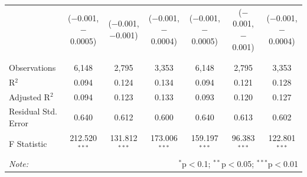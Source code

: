 \documentclass[alpha-refs]{wiley-article-01g}
\begin{document}
\begin{landscape}
\begin{table}[!htbp]
\begin{tabular}{@{\extracolsep{5pt}}lcccccc}
			& ($-$0.001, $-$0.0005) & ($-$0.001, $-$0.001) & ($-$0.001, $-$0.0004) & ($-$0.001, $-$0.0005) & ($-$0.001, $-$0.001) & ($-$0.001, $-$0.0004) \\ 
			& & & & & & \\ 
			\hline \\[-.8ex] 
			Observations & 6,148 & 2,795 & 3,353 & 6,148 & 2,795 & 3,353 \\ 
			R$^{2}$ & 0.094 & 0.124 & 0.134 & 0.094 & 0.121 & 0.128 \\ 
			Adjusted R$^{2}$ & 0.094 & 0.123 & 0.133 & 0.093 & 0.120 & 0.127 \\ 
			Residual Std. Error & 0.640 & 0.612 & 0.600 & 0.640 & 0.613 & 0.602 \\ 
			F Statistic & 212.520$^{***}$ & 131.812$^{***}$ & 173.006$^{***}$ & 159.197$^{***}$ & 96.383$^{***}$ & 122.801$^{***}$ \\ 
			\hline 
			\textit{Note:}  & \multicolumn{6}{r}{$^{*}$p$<$0.1; $^{**}$p$<$0.05; $^{***}$p$<$0.01} \\ 
		\end{tabular} 
	\end{table} 
	
\end{landscape}

\newpage
\end{document}
